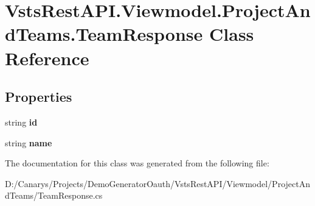 \hypertarget{class_vsts_rest_a_p_i_1_1_viewmodel_1_1_project_and_teams_1_1_team_response}{}\section{Vsts\+Rest\+A\+P\+I.\+Viewmodel.\+Project\+And\+Teams.\+Team\+Response Class Reference}
\label{class_vsts_rest_a_p_i_1_1_viewmodel_1_1_project_and_teams_1_1_team_response}
\subsection*{Properties}
\begin{DoxyCompactItemize}
\item 
\mbox{\label{class_vsts_rest_a_p_i_1_1_viewmodel_1_1_project_and_teams_1_1_team_response_a7b00fa436c03e268191cc5bce752843f}} 
string {\bfseries id}
\item 
\mbox{\label{class_vsts_rest_a_p_i_1_1_viewmodel_1_1_project_and_teams_1_1_team_response_a3f626b4adacc157852d885b399cfa667}} 
string {\bfseries name}
\end{DoxyCompactItemize}


The documentation for this class was generated from the following file\+:\begin{DoxyCompactItemize}
\item 
D\+:/\+Canarys/\+Projects/\+Demo\+Generator\+Oauth/\+Vsts\+Rest\+A\+P\+I/\+Viewmodel/\+Project\+And\+Teams/Team\+Response.\+cs\end{DoxyCompactItemize}
